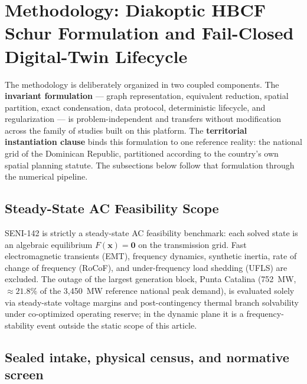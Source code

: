 \section{Methodology: Diakoptic HBCF Schur Formulation and Fail-Closed Digital-Twin Lifecycle}
\label{sec:methodology}

The methodology is deliberately organized in two coupled components. The \textbf{invariant formulation} --- graph representation, equivalent reduction, spatial partition, exact condensation, data protocol, deterministic lifecycle, and regularization --- is problem-independent and transfers without modification across the family of studies built on this platform. The \textbf{territorial instantiation clause} binds this formulation to one reference reality: the national grid of the Dominican Republic, partitioned according to the country's own spatial planning statute. The subsections below follow that formulation through the numerical pipeline.

\subsection{Steady-State AC Feasibility Scope}
\label{sub:scope}

SENI-142 is strictly a steady-state AC feasibility benchmark: each solved state is an algebraic equilibrium $F(\mathbf{x})=\mathbf{0}$ on the transmission grid. Fast electromagnetic transients (EMT), frequency dynamics, synthetic inertia, rate of change of frequency (RoCoF), and under-frequency load shedding (UFLS) are excluded. The outage of the largest generation block, Punta Catalina (752~MW, $\approx 21.8\%$ of the 3,450~MW reference national peak demand), is evaluated solely via steady-state voltage margins and post-contingency thermal branch solvability under co-optimized operating reserve; in the dynamic plane it is a frequency-stability event outside the static scope of this article.

\subsection{Sealed intake, physical census, and normative screen}
\label{sub:intake}

